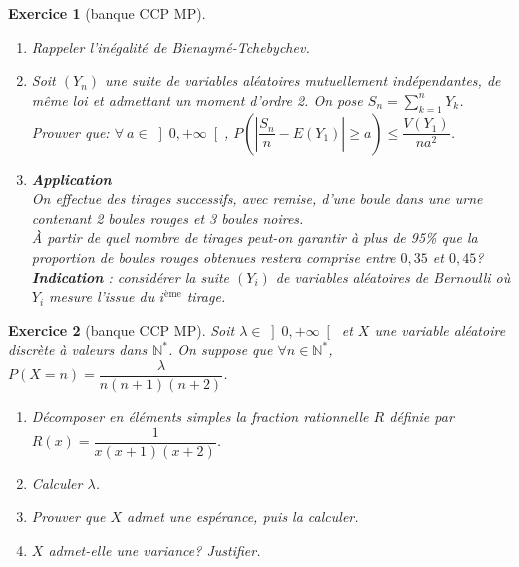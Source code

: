 \documentclass[12pt,a4paper,landscape]{article}
\newtheorem{Exo}{Exercice}
\begin{document}
\begin{Exo}[banque CCP MP]\ 
	\begin{enumerate}
	\item
	Rappeler l'inégalité de Bienaymé-Tchebychev.
	\item
	Soit $(Y_n)$ une suite de variables aléatoires mutuellement indépendantes, de même loi et admettant un moment d'ordre 2. On pose $S_n=\displaystyle\sum\limits_{k=1}^{n}Y_k$.\\
	
	Prouver que: $\forall\:a\in \left] 0,+\infty\right[ $, $P\left( \left|\dfrac{S_n}{n}-E(Y_1)\right|\geqslant a\right) \leqslant\dfrac{V(Y_1)}{na^2}$.
	\item \textbf{Application}\\
	On effectue des tirages successifs, avec remise, d'une boule dans une urne contenant 2 boules rouges et 3 boules noires.\\
	\`A partir de quel nombre de tirages peut-on garantir à plus de 95\% que la proportion de boules rouges obtenues restera comprise entre $0,35$ et $0,45$?\\
	\textbf{Indication} : considérer la suite $(Y_i)$ de variables aléatoires de Bernoulli où $Y_i$ mesure l'issue du $i^{\text{ème}}$  tirage.
	
\end{enumerate}
\end{Exo}




\begin{Exo}[banque CCP MP]
	Soit $\lambda \in{\left] 0,+\infty\right[ }$ et $X$ une variable aléatoire discrète à valeurs dans $\mathbb{N}^\ast$. On suppose que $\forall n\in\mathbb{N}^\ast$, $P(X=n)=\dfrac{\lambda}{n(n+1)(n+2)} $.
\begin{enumerate}
	\item Décomposer en éléments simples la fraction rationnelle $R$ définie par $R(x)=\dfrac{1}{x(x+1)(x+2)}$.
	\item
	Calculer $\lambda$.
	\item
	Prouver que $X$ admet une espérance, puis la calculer.
	\item
	$X$ admet-elle une variance? Justifier.
	
\end{enumerate}
\end{Exo}
\end{document}
